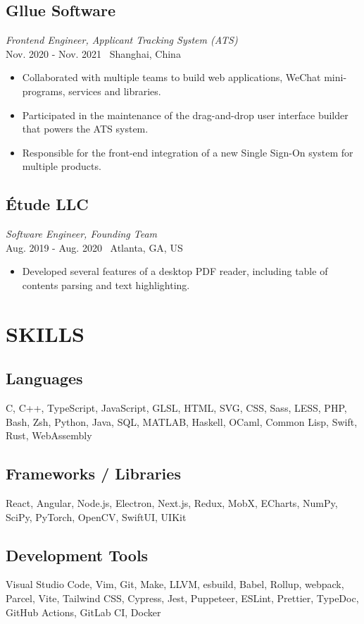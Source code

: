 \documentclass[11pt,twocolumn]{article}
\begin{document}
\subsection*{Gllue Software}
\textit{Frontend Engineer, Applicant Tracking System (ATS)}\\
Nov. 2020 - Nov. 2021 \textbullet\ Shanghai, China

\begin{itemize}
\item Collaborated with multiple teams to build web applications, WeChat mini-programs, services and libraries.
\item Participated in the maintenance of the drag-and-drop user interface builder that powers the ATS system.
\item Responsible for the front-end integration of a new Single Sign-On system for multiple products.
\end{itemize}

\subsection*{Étude LLC}
\textit{Software Engineer, Founding Team}\\
Aug. 2019 - Aug. 2020 \textbullet\ Atlanta, GA, US

\begin{itemize}
\item Developed several features of a desktop PDF reader, including table of contents parsing and text highlighting.
\end{itemize}

\section*{\textnormal{SKILLS}}
\subsection*{Languages}
C, C++, TypeScript, JavaScript, GLSL, HTML, SVG, CSS, Sass, LESS, PHP, Bash, Zsh, Python, Java, SQL, MATLAB, Haskell, OCaml, Common Lisp, Swift, Rust, WebAssembly

\subsection*{Frameworks / Libraries}
React, Angular, Node.js, Electron, Next.js, Redux, MobX, ECharts, NumPy, SciPy, PyTorch, OpenCV, SwiftUI, UIKit

\subsection*{Development Tools}
Visual Studio Code, Vim, Git, Make, LLVM, esbuild, Babel, Rollup, webpack, Parcel, Vite, Tailwind CSS, Cypress, Jest, Puppeteer, ESLint, Prettier, TypeDoc, GitHub Actions, GitLab CI, Docker
\end{document}
